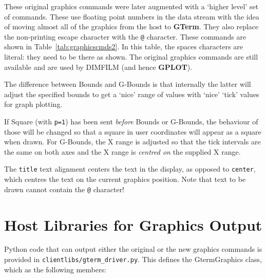 \documentclass[a4paper,twoside,11pt]{article}
\newcommand{\newpara}{\par\vspace{4mm}\noindent}
\begin{document}
\newpara
These original graphics commands were later augmented with a `higher level' set of
commands. These use floating point numbers in the data stream with the idea of moving almost all
of the graphics from the host to \textbf{GTerm}.  They also replace the non-printing escape
character with the \texttt{@} character. These commands are shown in Table~\ref{tab:graphicscmds2}.
In this table, the spaces characters are literal: they need to be there as shown. The original graphics 
commands are still available and are used by DIMFILM (and hence \textbf{GPLOT}).

\newpara
The difference between Bounds and G-Bounds  is that internally the latter will adjust the specified bounds
to get  a `nice' range of values with `nice' `tick' values for graph plotting.

\newpara
If Square (with \texttt{p=1}) has been sent \emph{before} Bounds or G-Bounds, the behaviour of those
will be changed so that a square in user coordinates will appear as a square when drawn. For G-Bounds, 
the X range is adjusted so that the tick intervals are the same on both
axes and the X range is \emph{centred on} the supplied X range.

\newpara
The \texttt{title} text alignment centers the text in the display, as opposed to \texttt{center}, which centres
the text on the current graphics position. Note that text to be drawn cannot contain the \texttt{@} character!

\section{Host Libraries for Graphics Output}
Python code that can output either the original or the new graphics commands is provided in
\texttt{clientlibs/gterm\_driver.py}. This defines the GtermGraphics class, which as the following
members:
\end{document}
